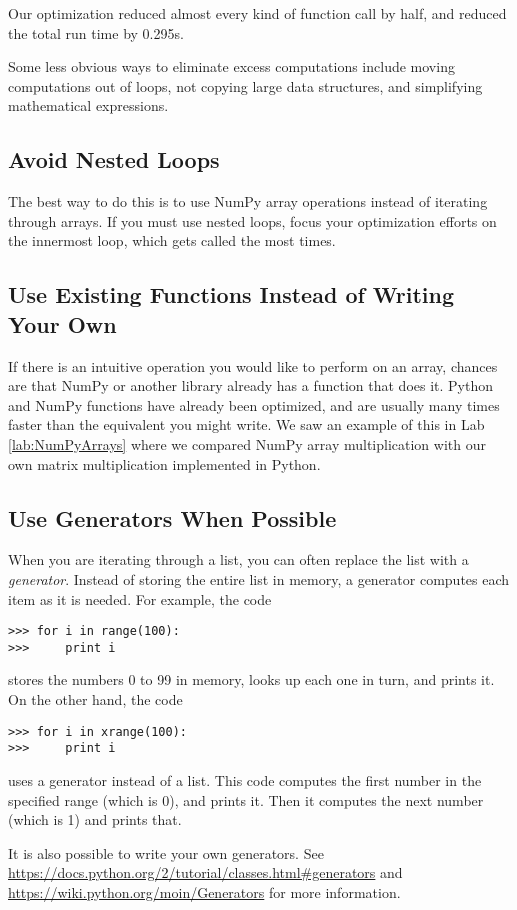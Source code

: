 Our optimization reduced almost every kind of function call by half, and reduced the total run time by 0.295s.

Some less obvious ways to eliminate excess computations include moving computations out of loops, not copying large data structures, and simplifying mathematical expressions.


\subsection*{Avoid Nested Loops}
The best way to do this is to use NumPy array operations instead of iterating through arrays.
If you must use nested loops, focus your optimization efforts on the innermost loop, which gets called the most times.

\subsection*{Use Existing Functions Instead of Writing Your Own}
If there is an intuitive operation you would like to perform on an array, chances are that NumPy or another library already has a function that does it.
Python and NumPy functions have already been optimized, and are usually many times faster than the equivalent you might write.
We saw an example of this in Lab \ref{lab:NumPyArrays} where we compared NumPy array multiplication with our own matrix multiplication implemented in Python.

\subsection*{Use Generators When Possible}
When you are iterating through a list, you can often replace the list with a \emph{generator}.
Instead of storing the entire list in memory, a generator computes each item as it is needed. 
For example, the code
\begin{lstlisting}
>>> for i in range(100):
>>>     print i
\end{lstlisting}
stores the numbers 0 to 99 in memory, looks up each one in turn, and prints it. 
On the other hand, the code
\begin{lstlisting}
>>> for i in xrange(100):
>>>     print i
\end{lstlisting}
uses a generator instead of a list. 
This code computes the first number in the specified range (which is 0), and prints it.
Then it computes the next number (which is 1) and prints that.

It is also possible to write your own generators. 
See \url{https://docs.python.org/2/tutorial/classes.html#generators} and \url{https://wiki.python.org/moin/Generators} for more information.

